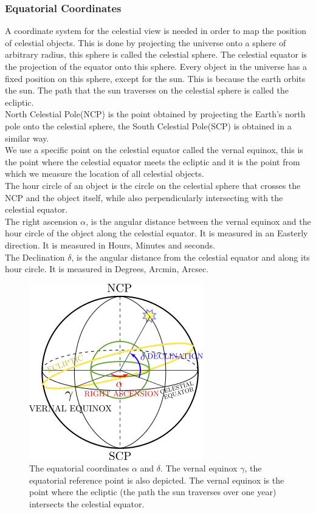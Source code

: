 \subsubsection{Equatorial Coordinates}
\FloatBarrier
A coordinate system for the celestial view is needed in order to map the position of celestial objects. This is done by projecting the universe onto a sphere of arbitrary radius, this sphere is called the celestial sphere. The celestial equator is the projection of the equator onto this sphere. Every object in the universe has a fixed position on this sphere, except for the sun. This is because the earth orbits the sun. The path that the sun traverses on the celestial sphere is called the ecliptic. 
\\North Celestial Pole(NCP) is the point obtained by projecting the Earth's north pole onto the celestial sphere, the South Celestial Pole(SCP) is obtained in a similar way. \\
We use a specific point on the celestial equator called the vernal equinox, this is the point where the celestial equator meets the ecliptic and it is the point from which we measure the location of all celestial objects. \\
The hour circle of an object is the circle on the celestial sphere that crosses the NCP and the object itself, while also perpendicularly intersecting with the celestial equator. 
\\
The right ascension $\alpha$, is the angular distance between the vernal equinox and the hour circle of the object along the celestial equator. It is measured in an Easterly direction. It is measured in Hours, Minutes and seconds.\\
The Declination $\delta$, is the angular distance from the celestial equator and along its hour circle. It is measured in Degrees, Arcmin, Arcsec.\\
\begin{figure}
    \centering
    \includegraphics[scale=0.6]{images/equatorial.png}
    \caption{The equatorial coordinates $\alpha$ and $\delta$. The vernal equinox $\gamma$, the equatorial reference point is also depicted. The vernal 
    equinox is the point where the ecliptic (the path the sun traverses over one year) intersects the celestial equator\cite{TEXTBOOK}.}
    \label{fig:equatoral}
\end{figure}
